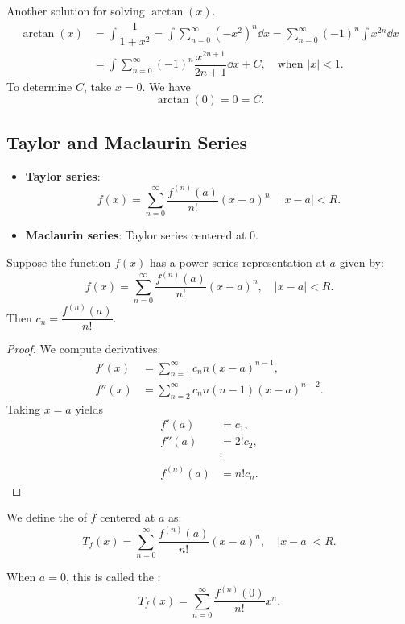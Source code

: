\begin{ex}
Another solution for solving $\arctan(x)$.
\begin{align*}
    \arctan(x) &= \int \dfrac{1}{1+x^2} 
    = \int \sum_{n=0}^{\infty} (-x^2)^n \dd x = \sum_{n=0}^{\infty} (-1)^n \int x^{2n} \dd x\\
    &= \int \sum_{n=0}^{\infty} (-1)^n \dfrac{x^{2n+1}}{2n+1}\dd x + C, \quad \text{when } |x| < 1.
\end{align*}
To determine $C$, take $x = 0$. We have
\[\arctan(0) = 0 = C.\]
\end{ex}

\subsection{Taylor and Maclaurin Series}  
\begin{center}
\begin{tcolorbox}
    \begin{itemize}
        \item \textbf{Taylor series}: 
        \[f(x) = \sum_{n=0}^{\infty} \dfrac{f^{(n)}(a)}{n!}(x-a)^n \quad |x-a| < R. \]
        \item \textbf{Maclaurin series}: Taylor series centered at 0.
    \end{itemize}
\end{tcolorbox}
\end{center}
\begin{thm}
    Suppose the function $f(x)$ has a power series representation at $a$ given by:
    \[f(x) = \sum_{n=0}^{\infty} \dfrac{f^{(n)}(a)}{n!}(x-a)^n, \quad |x-a| < R.\]
    Then $c_n = \dfrac{f^{(n)}(a)}{n!}$.
\end{thm}

\begin{proof}
    We compute derivatives:
    \begin{align*}
        f'(x) &= \sum_{n=1}^{\infty} c_n n (x-a)^{n-1}, \\
        f''(x) &= \sum_{n=2}^{\infty} c_n n (n-1) (x-a)^{n-2}.
    \end{align*}
    Taking $x = a$ yields
    \begin{align*}
        f'(a) &= c_1, \tag{$C_1$ is the only non-vanishing term}\\
        f''(a) &= 2!c_2,\\
        &\vdots\\
        f^{(n)}(a) &= n!c_n.
    \end{align*}
\end{proof}
\begin{defn}
    We define the  of $f$ centered at $a$ as:
    \[T_f(x) = \sum_{n=0}^{\infty} \dfrac{f^{(n)}(a)}{n!}(x-a)^n, \quad |x-a| < R.\]

    When $a=0$, this is called the :
    \[T_f(x) = \sum_{n=0}^{\infty} \dfrac{f^{(n)}(0)}{n!}x^n.\]
\end{defn}

